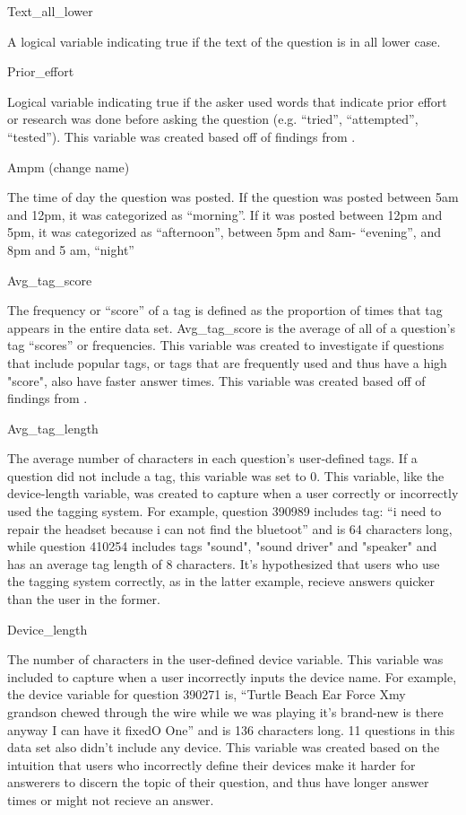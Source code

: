 \documentclass[12pt]{article}
\begin{document}
Text\_all\_lower

A logical variable indicating true if the text of the question is in all lower case. 

Prior\_effort 

Logical variable indicating true if the asker used words that indicate prior effort or research was done before asking the question (e.g. ``tried'', ``attempted'', ``tested''). This variable was created based off of findings from \cite{Bhat2014}. 

Ampm (change name)

The time of day the question was posted. If the question was posted between 5am and 12pm, it was categorized as ``morning''. If it was posted between 12pm and 5pm, it was categorized as ``afternoon'', between 5pm and 8am- ``evening'', and 8pm and 5 am, ``night''

Avg\_tag\_score

The frequency or “score” of a tag is defined as the proportion of times that tag appears in the entire data set. Avg\_tag\_score is the average of all of a question’s tag “scores” or frequencies. This variable was created to investigate if questions that include popular tags, or tags that are frequently used and thus have a high "score", also have faster answer times. This variable was created based off of findings from \cite{Bhat2014}. 

Avg\_tag\_length

The average number of characters in each question's user-defined tags. If a question did not include a tag, this variable was set to 0. This variable, like the device-length variable, was created to capture when a user correctly or incorrectly used the tagging system. For example, question 390989 includes tag: “i need to repair the headset because i can not find the bluetoot” and is 64 characters long, while question 410254 includes tags "sound", "sound driver" and "speaker" and has an average tag length of 8 characters. It's hypothesized that users who use the tagging system correctly, as in the latter example, recieve answers quicker than the user in the former. 

Device\_length

The number of characters in the user-defined device variable. This variable was included to capture when a user incorrectly inputs the device name. For example, the device variable for question 390271 is, “Turtle Beach Ear Force Xmy grandson chewed through the wire while we was playing it's brand-new is there anyway I can have it fixedO One” and is 136 characters long. 11 questions in this data set also didn’t include any device. This variable was created based on the intuition that users who incorrectly define their devices make it harder for answerers to discern the topic of their question, and thus have longer answer times or might not recieve an answer.
\end{document}
